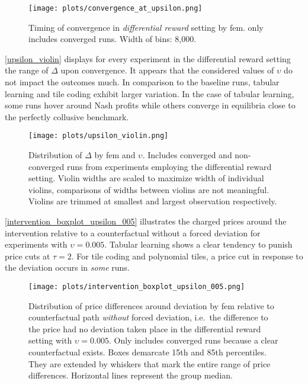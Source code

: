 \begin{figure}
	\texttt{[image: plots/convergence\_at\_upsilon.png]}
	\caption[Timing of convergence in \emph{differential reward} setting by \gls{fem}]{Timing of convergence in \emph{differential reward} setting by \gls{fem}. only includes converged runs. Width of bins: 8,000.}
	\label{convergence_at_upsilon}
\end{figure}


\autoref{upsilon_violin} displays for every experiment in the differential reward setting the range of $\Delta$ upon convergence. It appears that the considered values of $\upsilon$ do not impact the outcomes much. In comparison to the baseline runs, tabular learning and tile coding exhibit larger variation. In the case of tabular learning, some runs hover around Nash profits while others converge in equilibria close to the perfectly collusive benchmark.


\begin{figure}
	\texttt{[image: plots/upsilon\_violin.png]}
	\caption[Distribution of $\Delta$ by \gls{fem} and $\upsilon$]{Distribution of $\Delta$ by \gls{fem} and $\upsilon$. Includes converged and non-converged runs from experiments employing the differential reward setting. Violin widths are scaled to maximize width of individual violins, comparisons of widths between violins are not meaningful. Violins are trimmed at smallest and largest observation respectively.}
	\label{upsilon_violin}
\end{figure}

\autoref{intervention_boxplot_upsilon_005} illustrates the charged prices around the intervention relative to a counterfactual without a forced deviation for experiments with $\upsilon = 0.005$. Tabular learning shows a clear tendency to punish price cuts at $\tau = 2$. For tile coding and polynomial tiles, a price cut in response to the deviation occurs in \emph{some} runs.

\begin{figure}
	\texttt{[image: plots/intervention\_boxplot\_upsilon\_005.png]}
	\caption[Distribution of price differences around deviation by \gls{fem} in differential reward setting with $\upsilon = 0.005$]{Distribution of price differences around deviation by \gls{fem} relative to counterfactual path \emph{without} forced deviation, i.e.\ the difference to the price had no deviation taken place in the differential reward setting with $\upsilon = 0.005$. Only includes converged runs because a clear counterfactual exists. Boxes demarcate 15th and 85th percentiles. They are extended by whiskers that mark the entire range of price differences. Horizontal lines represent the group median.}
	\label{intervention_boxplot_upsilon_005}
\end{figure}